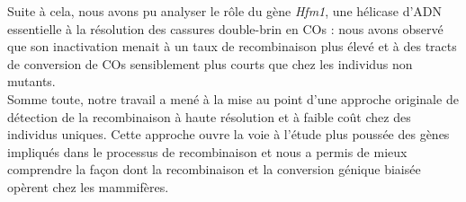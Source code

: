 {Suite à cela, nous avons pu analyser le rôle du gène \textit{Hfm1}, une hélicase d'ADN essentielle à la résolution des cassures double-brin en COs : nous avons observé que son inactivation menait à un taux de recombinaison plus élevé et à des tracts de conversion de COs sensiblement plus courts que chez les individus non mutants.\\



Somme toute, notre travail a mené à la mise au point d'une approche originale de détection de la recombinaison à haute résolution et à faible coût chez des individus uniques.
Cette approche ouvre la voie à l'étude plus poussée des gènes impliqués dans le processus de recombinaison et nous a permis de mieux comprendre la façon dont la recombinaison et la conversion génique biaisée opèrent chez les mammifères.



}





%
%
%
%
%
%
%

